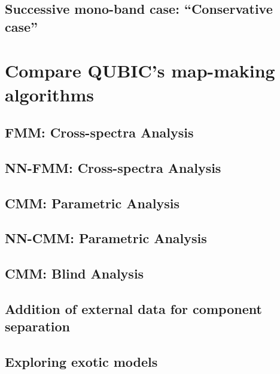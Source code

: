 \documentclass[../../thesis.tex]{subfiles}
\begin{document}
\subsection{Successive mono-band case: \enquote{Conservative case}}

\section{Compare QUBIC's map-making algorithms}

\subsection{FMM: Cross-spectra Analysis}

\subsection{NN-FMM: Cross-spectra Analysis}

\subsection{CMM: Parametric Analysis}

\subsection{NN-CMM: Parametric Analysis}

\subsection{CMM: Blind Analysis}

\subsection{Addition of external data for component separation}

\subsection{Exploring exotic models}
\end{document}
